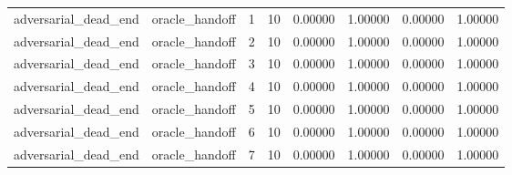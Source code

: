 \documentclass{article}
\begin{document}
\begin{table}[tbp]
{\begin{tabular}{llllllll}
adversarial\_dead\_end & oracle\_handoff & 1 & 10 & 0.00000 & 1.00000 & 0.00000 & 1.00000 \\
adversarial\_dead\_end & oracle\_handoff & 2 & 10 & 0.00000 & 1.00000 & 0.00000 & 1.00000 \\
adversarial\_dead\_end & oracle\_handoff & 3 & 10 & 0.00000 & 1.00000 & 0.00000 & 1.00000 \\
adversarial\_dead\_end & oracle\_handoff & 4 & 10 & 0.00000 & 1.00000 & 0.00000 & 1.00000 \\
adversarial\_dead\_end & oracle\_handoff & 5 & 10 & 0.00000 & 1.00000 & 0.00000 & 1.00000 \\
adversarial\_dead\_end & oracle\_handoff & 6 & 10 & 0.00000 & 1.00000 & 0.00000 & 1.00000 \\
adversarial\_dead\_end & oracle\_handoff & 7 & 10 & 0.00000 & 1.00000 & 0.00000 & 1.00000 \\
\bottomrule
\end{tabular}
}
\end{table}

\clearpage
\end{document}
